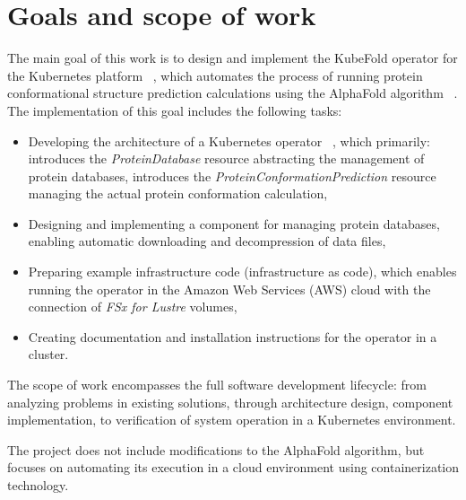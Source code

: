 \section{Goals and scope of work}

The main goal of this work is to design and implement the KubeFold operator for the Kubernetes platform ~\cite{kubernetes}, which automates the process of running protein conformational structure prediction calculations using the AlphaFold algorithm ~\cite{alphafold3}.
The implementation of this goal includes the following tasks:

\begin{itemize}
    \item Developing the architecture of a Kubernetes operator ~\cite{k8s_operators}, which primarily:
    \subitem introduces the \textit{ProteinDatabase} resource abstracting the management of protein databases,
    \subitem introduces the \textit{ProteinConformationPrediction} resource managing the actual protein conformation calculation,
    \item Designing and implementing a component for managing protein databases, enabling automatic downloading and decompression of data files,
    \item Preparing example infrastructure code (infrastructure as code), which enables running the operator in the Amazon Web Services (AWS) cloud with the connection of \textit{FSx for Lustre} volumes,
    \item Creating documentation and installation instructions for the operator in a cluster.
\end{itemize}

The scope of work encompasses the full software development lifecycle: from analyzing problems in existing solutions, through architecture design, component implementation, to verification of system operation in a Kubernetes environment.

The project does not include modifications to the AlphaFold algorithm, but focuses on automating its execution in a cloud environment using containerization technology.

